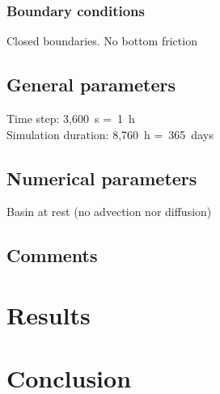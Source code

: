 \subsubsection{Boundary conditions}
%
Closed boundaries. No bottom friction
%
\subsection{General parameters}
%
Time step: 3,600~s =~1~h\\
Simulation duration: 8,760~h =~365~days
%
%
%
\subsection{Numerical parameters}
%
Basin at rest (no advection nor diffusion)
%
\subsection{Comments}
%
%
%
\section{Results}
%

%
\section{Conclusion}
%

%
%
